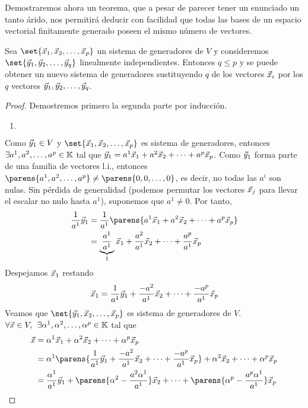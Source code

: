 \documentclass[../algebra_lineal.tex]{subfiles}
\begin{document}
Demostraremos ahora un teorema, que a pesar de parecer tener un enunciado un tanto árido, nos permitirá deducir con facilidad que todas las bases de un espacio vectorial finitamente generado poseen el mismo número de vectores.

\begin{theorem}[Steinitz]
    Sea $\set{\vlst{x}{p}}$ un sistema de generadores de $V$ y consideremos $\set{\vlst{y}{q}}$ linealmente independientes. Entonces $q \le p$ y se puede obtener un nuevo sistema de generadores sustituyendo $q$ de los vectores $\vec{x}_i$ por los $q$ vectores ${\vec{y}}_{1}, {\vec{y}}_{2}, \dots, {\vec{y}}_{q}$.
\end{theorem}

\begin{proof}
    Demostremos primero la segunda parte por inducción.
    \begin{enumerate}[itemindent=30pt]
        \item[\protect\fbox{Caso base}] $ $ \linebreak
    \end{enumerate}
    Como $\vec{y}_1 \in V$ y $\set{\vlst{x}{p}}$ es sistema de generadores, entonces $\exists {a}^{1}, {a}^{2}, \dots, {a}^{p} \in \mathbb{K}$ tal que $\vec{y}_1 = {a}^{1}\vec{x}_{1}+{a}^{2}\vec{x}_{2}+\dots+{a}^{p}\vec{x}_{p}$. Como $\vec{y}_1$ forma parte de una familia de vectores l.i., entonces $\parens{\slst{a}{p}} \ne \parens{0, 0, \dots, 0}$, es decir, no todas las $a^i$ son nulas. Sin pérdida de generalidad (podemos permutar los vectores $\vec{x}_j$ para llevar el escalar no nulo hasta $a^1$), suponemos que $a^1\ne 0$. Por tanto,
    \begin{align*}
        \frac{1}{a^1}\vy_1 &= \frac{1}{a^1} \parens{\lincomb{a}{x}{p}} \\
                        &= \underbrace{\frac{a^1}{a^1}}_{1}\vx_1 + \frac{a^2}{a^1}\vx_2 + \dots + \frac{a^p}{a^1}\vx_p 
    \end{align*}
    Despejamos $\vec{x}_1$ restando
    \[
        \vec{x}_1 = \frac{1}{a^1}\vec{y}_{1} + \frac{-a^2}{a^1}\vec{x}_2 + \dots + \frac{-a^p}{a^1}\vec{x}_p
    \]
    Veamos que $\set{\vy_1, \vx_2, \dots, \vx_p}$ es sistema de generadores de $V$. $\forall \vec{x} \in V, \hspace{1.5mm} \exists {\alpha}^{1}, {\alpha}^{2}, \dots, {\alpha}^{p} \in \mathbb{K}$ tal que 
    \begin{align*}
        \vx &= \lincomb{\alpha}{x}{p} \\
            &= \alpha^1 \parens{\frac{1}{a^1}\vy_{1} + \frac{-a^2}{a^1}\vx_2 + \dots + \frac{-a^p}{a^1}\vx_p} + \alpha^2\vx_2 + \dots + \alpha^p\vx_p \\
            &= \frac{\alpha^1}{a^1}\vy_1 + \parens{\alpha^2 - \frac{a^2 \alpha^1}{a^1}}\vx_2 + \dots + \parens{\alpha^p - \frac{a^p \alpha^1}{a^1}}\vx_p

\end{align*}
\end{proof}
\end{document}
